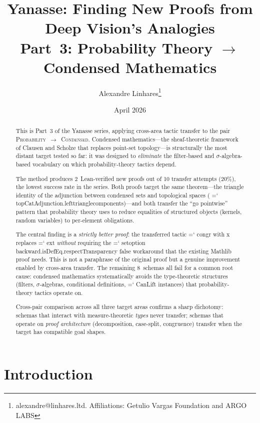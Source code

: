 \documentclass[11pt]{article}
\title{Yanasse: Finding New Proofs from Deep Vision's Analogies\\[0.5em]
\large Part~3: Probability Theory $\to$ Condensed Mathematics}
\author{Alexandre Linhares\thanks{alexandre@linhares.ltd. Affiliations: Getulio Vargas Foundation and ARGO LABS}}
\date{April 2026}
\renewcommand{\texttt}[1]{%
  \begingroup\ttfamily\hyphenchar\font=`\-\relax
  \def\_{\textunderscore\discretionary{}{}{}}%
  #1\endgroup}
\theoremstyle{definition}
\theoremstyle{remark}
\begin{document}
\maketitle

\begin{abstract}
This is Part~3 of the Yanasse series, applying cross-area tactic
transfer to the pair \textsc{Probability}~$\to$~\textsc{Condensed}.  Condensed mathematics---the sheaf-theoretic
framework of Clausen and Scholze that replaces point-set
topology---is structurally the most distant target tested so far:
it was designed to \emph{eliminate} the filter-based and
$\sigma$-algebra-based vocabulary on which probability-theory
tactics depend.

The method produces 2~Lean-verified new proofs out of 10 transfer
attempts (20\%), the lowest success rate in the series.  Both
proofs target the same theorem---the triangle identity of the
adjunction between condensed sets and topological spaces
(\texttt{topCatAdjunction.left\_triangle\_components})---and both
transfer the ``go pointwise'' pattern that probability theory uses
to reduce equalities of structured objects (kernels, random
variables) to per-element obligations.

The central finding is a \emph{strictly better proof}: the
transferred tactic \texttt{congr with x} replaces \texttt{ext}
\emph{without} requiring the
\texttt{set\_option backward.isDefEq.respectTransparency false}
workaround that the existing Mathlib proof needs.  This is not a
paraphrase of the original proof but a genuine improvement enabled
by cross-area transfer.  The remaining 8~schemas all fail for a
common root cause: condensed mathematics systematically avoids the
type-theoretic structures (filters, $\sigma$-algebras, conditional
definitions, \texttt{CanLift} instances) that probability-theory
tactics operate on.

Cross-pair comparison across all three target areas confirms a
sharp dichotomy: schemas that interact with measure-theoretic
\emph{types} never transfer; schemas that operate on
\emph{proof architecture} (decomposition, case-split, congruence)
transfer when the target has compatible goal shapes.
\end{abstract}

\newpage
\tableofcontents
\newpage

\section{Introduction}\label{sec:intro}
\end{document}
